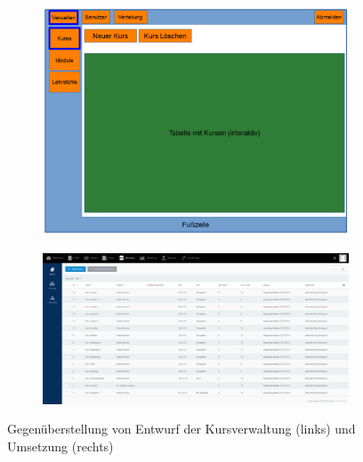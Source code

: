         \begin{figure}
            \centering
            \begin{subfigure}{0.4\textwidth}
                \includegraphics[width=1.0\textwidth]{./implementation/images/MockUpsBackend/backendManageCourses.png}
            \end{subfigure}
            \begin{subfigure}{0.59\textwidth}
                \includegraphics[width=1.0\textwidth]{./implementation/images/manageCourses.png}
            \end{subfigure}
            \caption{Gegenüberstellung von Entwurf der Kursverwaltung (links) und Umsetzung (rechts)}
            \label{fig:comparisonManageCourses}
        \end{figure}
        
